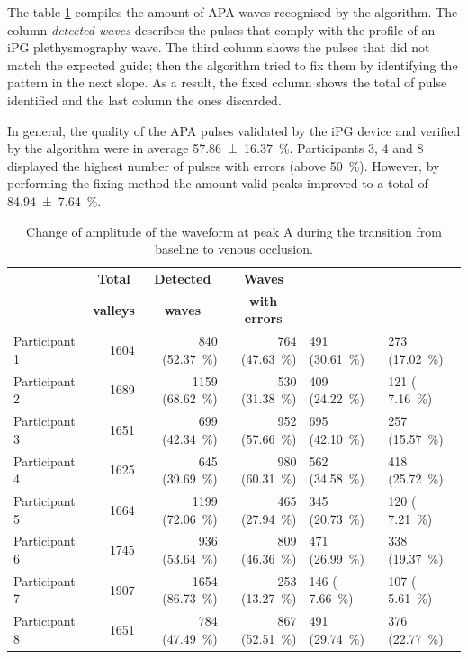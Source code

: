The table \ref{tbl:detect APA} compiles the amount of APA waves recognised by the algorithm. The column \textit{detected waves} describes the pulses that comply with the profile of an iPG plethysmography wave. The third column shows the pulses that did not match the expected guide; then the algorithm tried to fix them by identifying the pattern in the next slope. As a result, the fixed column shows the total of pulse identified and the last column the ones discarded.

In general, the quality of the APA pulses validated by the iPG device and verified by the algorithm were in average \SI{57.86(1637)}{\percent}. Participants 3, 4 and 8 displayed the highest number of pulses with errors (above \SI{50}{\percent}). However, by performing the fixing method the amount valid peaks improved to a total of \SI{84.94(764)}{\percent}.

\begin{table}[!htbp]
	\caption{Change of amplitude of the waveform at peak A during the transition from baseline to venous occlusion.}
	\label{tbl:detect APA}
	\centering\small
	\begin{tabular}{lrrr>{\columncolor[gray]{0.8}}l>{\columncolor[gray]{0.9}}l}
		\toprule
		& \multicolumn{1}{c}{\textbf{Total}}
		& \multicolumn{1}{c}{\textbf{Detected}} & \multicolumn{1}{c}{\textbf{Waves}}& \multicolumn{1}{c}{\textbf{Fixed}} & \multicolumn{1}{c}{\textbf{Discarded}} \\
		& \multicolumn{1}{c}{\textbf{valleys}} & \multicolumn{1}{c}{\textbf{waves}} & \multicolumn{1}{c}{\textbf{with errors}}& \multicolumn{1}{c}{\textbf{waves}} & \multicolumn{1}{c}{\textbf{waves}} \\
		\midrule
		Participant 1	&1604	& 840 (\SI{52.37}{\percent})	&764 (\SI{47.63}{\percent})	&491 (\SI{30.61}{\percent})	&273 (\SI{17.02}{\percent})\\
		Participant 2	&1689	&1159 (\SI{68.62}{\percent})	&530 (\SI{31.38}{\percent})	&409 (\SI{24.22}{\percent})	&121 ( \SI{7.16}{\percent})\\
		Participant 3	&1651	& 699 (\SI{42.34}{\percent})	&952 (\SI{57.66}{\percent})	&695 (\SI{42.10}{\percent})	&257 (\SI{15.57}{\percent})\\
		Participant 4	&1625	& 645 (\SI{39.69}{\percent})	&980 (\SI{60.31}{\percent})	&562 (\SI{34.58}{\percent})	&418 (\SI{25.72}{\percent})\\
		Participant 5	&1664	&1199 (\SI{72.06}{\percent})	&465 (\SI{27.94}{\percent})	&345 (\SI{20.73}{\percent})	&120 ( \SI{7.21}{\percent})\\
		Participant 6	&1745	& 936 (\SI{53.64}{\percent})	&809 (\SI{46.36}{\percent})	&471 (\SI{26.99}{\percent})	&338 (\SI{19.37}{\percent})\\
		Participant 7	&1907	&1654 (\SI{86.73}{\percent})	&253 (\SI{13.27}{\percent})	&146 ( \SI{7.66}{\percent})	&107 ( \SI{5.61}{\percent})\\
		Participant 8	&1651	& 784 (\SI{47.49}{\percent})	&867 (\SI{52.51}{\percent})	&491 (\SI{29.74}{\percent})	&376 (\SI{22.77}{\percent})\\
		\bottomrule
	\end{tabular}
\end{table}

